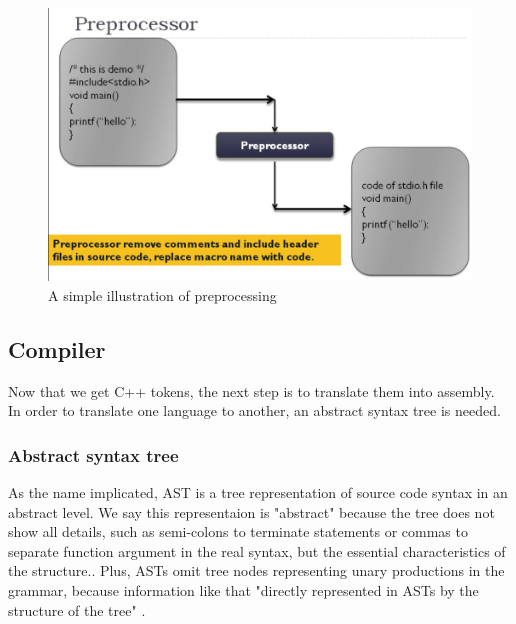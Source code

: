         \begin{figure}
            \centering
            \includegraphics[scale = 0.25]
            {Images/concepts/Preprocessor.png}
            \caption[A simple illustration of preprocessing]%
            {A simple illustration of preprocessing\footnotemark}    \label{fig:Preprocessor}
        \end{figure}

            
    
    
    
    \subsection{Compiler}
        Now that we get C++ tokens, the next step is to translate them into assembly. In order to translate one language to another, an abstract syntax tree is needed.  
        
        \subsubsection{Abstract syntax tree}
                    
            As the name implicated, AST is a tree representation of source code syntax in an abstract level. We say this representaion is "abstract" because the tree does not show all details, such as semi-colons to terminate statements or commas to separate function argument in the real syntax, but the essential characteristics of the structure.\cite {Joel-Jones-03}. Plus, ASTs omit tree nodes representing unary productions in the grammar, because information like that 
    "directly represented in ASTs by the structure of the tree"
    \cite {Joel-Jones-03}.
             
